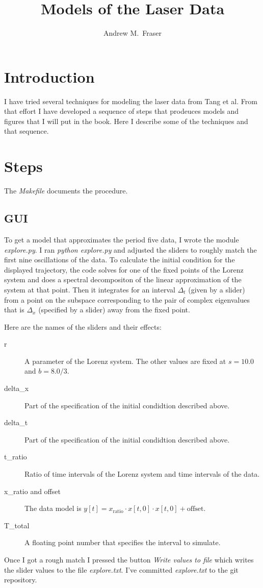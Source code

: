 \documentclass[12pt]{article}
\title{Models of the Laser Data}
\author{Andrew M.\ Fraser}
\begin{document}
\maketitle

\section{Introduction}
\label{sec:introduction}

I have tried several techniques for modeling the laser data from Tang
et al.  From that effort I have developed a sequence of steps that
prodeuces models and figures that I will put in the book.  Here I
describe some of the techniques and that sequence.

\section{Steps}
\label{sec:steps}

The \emph{Makefile} documents the procedure.

\subsection{GUI}
\label{sec:gui}

To get a model that approximates the period five data, I wrote the
module \emph{explore.py}.  I ran \emph{python explore.py} and adjusted
the sliders to roughly match the first nine oscillations of the data.
To calculate the initial condition for the displayed trajectory, the
code solves for one of the fixed points of the Lorenz system and does
a spectral decompositon of the linear approximation of the system at
that point.  Then it integrates for an interval $\Delta_t$ (given by a
slider) from a point on the subspace corresponding to the pair of
complex eigenvalues that is $\Delta_x$ (specified by a slider) away
from the fixed point.

Here are the names of the sliders and their effects:
\begin{description}
\item[r] A parameter of the Lorenz system.  The other values are fixed
  at $s=10.0$ and $b=8.0/3$.
\item[delta\_x] Part of the specification of the initial condidtion
  described above.
\item[delta\_t] Part of the specification of the initial condidtion
  described above.
\item[t\_ratio] Ratio of time intervals of the Lorenz system and time
  intervals of the data.
\item[x\_ratio and offset] The data model is $y[t] = x_{\text{ratio}} \cdot
  x[t,0] \cdot x[t,0] + \text{offset}$.
\item[T\_total] A floating point number that specifies the interval to
  simulate.
\end{description}
Once I got a rough match I pressed the button \emph{Write values to
  file} which writes the slider values to the file \emph{explore.txt}.
I've committed \emph{explore.txt} to the git repository.
\end{document}
